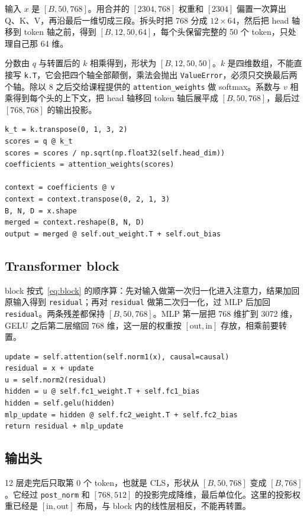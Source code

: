 \documentclass[a4paper,12pt]{article}
\begin{document}
输入 $x$ 是 $[B,50,768]$。用合并的 $[2304,768]$ 权重和 $[2304]$ 偏置一次算出 Q、K、V，再沿最后一维切成三段。拆头时把 768 分成 $12\times64$，然后把 head 轴移到 token 轴之前，得到 $[B,12,50,64]$，每个头保留完整的 50 个 token，只处理自己那 64 维。

分数由 $q$ 与转置后的 $k$ 相乘得到，形状为 $[B,12,50,50]$。$k$ 是四维数组，不能直接写 \texttt{k.T}，它会把四个轴全部颠倒，乘法会抛出 \texttt{ValueError}，必须只交换最后两个轴。除以 8 之后交给课程提供的 \texttt{attention\_weights} 做 softmax。系数与 $v$ 相乘得到每个头的上下文，把 head 轴移回 token 轴后展平成 $[B,50,768]$，最后过 $[768,768]$ 的输出投影。

\begin{verbatim}
k_t = k.transpose(0, 1, 3, 2)
scores = q @ k_t
scores = scores / np.sqrt(np.float32(self.head_dim))
coefficients = attention_weights(scores)

context = coefficients @ v
context = context.transpose(0, 2, 1, 3)
B, N, D = x.shape
merged = context.reshape(B, N, D)
output = merged @ self.out_weight.T + self.out_bias
\end{verbatim}

\subsection{Transformer block}

block 按式~\eqref{eq:block} 的顺序算：先对输入做第一次归一化进入注意力，结果加回原输入得到 \texttt{residual}；再对 \texttt{residual} 做第二次归一化，过 MLP 后加回 \texttt{residual}。两条残差都保持 $[B,50,768]$。MLP 第一层把 768 维扩到 3072 维，GELU 之后第二层缩回 768 维，这一层的权重按 $[\text{out},\text{in}]$ 存放，相乘前要转置。

\begin{verbatim}
update = self.attention(self.norm1(x), causal=causal)
residual = x + update
u = self.norm2(residual)
hidden = u @ self.fc1_weight.T + self.fc1_bias
hidden = self.gelu(hidden)
mlp_update = hidden @ self.fc2_weight.T + self.fc2_bias
return residual + mlp_update
\end{verbatim}

\subsection{输出头}

12 层走完后只取第 0 个 token，也就是 CLS，形状从 $[B,50,768]$ 变成 $[B,768]$。它经过 \texttt{post\_norm} 和 $[768,512]$ 的投影完成降维，最后单位化。这里的投影权重已经是 $[\text{in},\text{out}]$ 布局，与 block 内的线性层相反，不能再转置。
\end{document}
